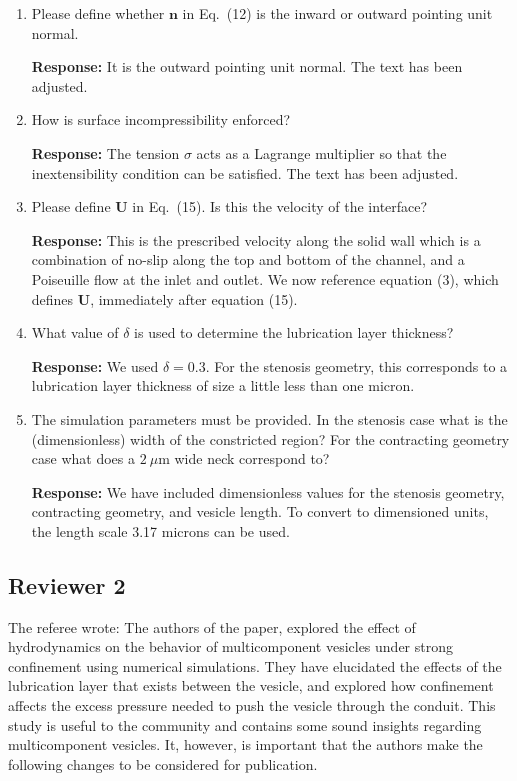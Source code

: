 \documentclass[11pt]{article}
\begin{document}
\begin{enumerate}
\item Please define whether $\mathbf{n}$ in Eq.~(12) is the inward or outward pointing unit normal.

\noindent
{\bf Response:} It is the outward pointing unit normal. The text has
    been adjusted.

\item How is surface incompressibility enforced?

\noindent
{\bf Response:} The tension $\sigma$ acts as a Lagrange multiplier so
    that the inextensibility condition can be satisfied. The text has
    been adjusted.

\item Please define $\mathbf{U}$ in Eq.~(15). Is this the velocity of
  the interface?

{\bf Response:} This is the prescribed velocity along the solid wall
    which is a combination of no-slip along the top and bottom of the
    channel, and a Poiseuille flow at the inlet and outlet. We now
    reference equation (3), which defines $\mathbf{U}$, immediately
    after equation (15). 

\item What value of $\delta$ is used to determine the lubrication layer
  thickness?

{\bf Response:} We used $\delta = 0.3$. For the stenosis geometry, this
corresponds to a lubrication layer thickness of size a little less than
one micron.

\item The simulation parameters must be provided. In the stenosis case
  what is the (dimensionless) width of the constricted region? For the
    contracting geometry case what does a $2~\mu$m wide neck correspond
    to?

{\bf Response:} We have included dimensionless values for the stenosis
geometry, contracting geometry, and vesicle length. To convert to
dimensioned units, the length scale 3.17 microns can be used.

\end{enumerate}

\newpage 
\subsection*{Reviewer 2}

The referee wrote: The authors of the paper, explored the effect of
hydrodynamics on the behavior of multicomponent vesicles under strong
confinement using numerical simulations. They have elucidated the
effects of the lubrication layer that exists between the vesicle, and
explored how confinement affects the excess pressure needed to push the
vesicle through the conduit. This study is useful to the community and
contains some sound insights regarding multicomponent vesicles. It,
however, is important that the authors make the following changes to be
considered for publication.
\end{document}
